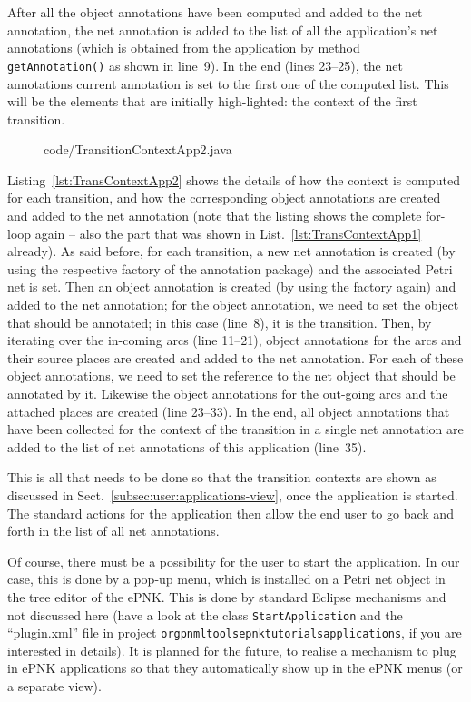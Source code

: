After all the object annotations have been computed and added to the net
annotation, the net annotation is added to the list of all the application's net
annotations (which is obtained from the application by method {\tt
getAnnotation()} as shown in line~9). In the end (lines 23--25), the net
annotations current annotation is set to the first one of the computed list.
This will be the elements that are initially high-lighted: the context of the
first transition.
 
\begin{figure}[htbp!]
%
  {code/TransitionContextApp2.java}
\end{figure}
%
Listing~\ref{lst:TransContextApp2} shows the details of how the context 
is computed for each transition, and how the corresponding object annotations
are created and added to the net annotation (note that the listing shows
the complete for-loop again -- also the part that was shown in
List.~\ref{lst:TransContextApp1} already). As said before, for each transition,
a new net annotation is created (by using the respective factory of the
annotation package) and the associated Petri net is set. Then an object
annotation is created (by using the factory again) and added to the net
annotation; for the object annotation, we need to set the object that should be
annotated; in this case (line~8), it is the transition. Then, by iterating over
the in-coming arcs (line 11--21), object annotations for the arcs and their
source places are created and added to the net annotation. For each of these
object annotations, we need to set the reference to the net object that should
be annotated by it. Likewise the object annotations for the out-going arcs
and the attached places are created (line 23--33).
In the end, all object annotations that have been collected for the context of
the transition in a single net annotation are added to the list of net
annotations of this application (line~35).

This is all that needs to be done so that the transition contexts are shown
as discussed in Sect.~\ref{subsec:user:applications-view}, once the
application is started. The standard actions for the application then allow the
end user to go back and forth in the list of all net annotations.

Of course, there must be a possibility for the user to start the application. In
our case, this is done by a pop-up menu, which is installed on a Petri net object in the tree
editor of the ePNK. This is done by standard Eclipse mechanisms and not discussed
here (have a look at the class {\tt StartApplication} and the ``plugin.xml'' file
in project
{\tt org\qnsep{}pnml\qnsep{}tools\qnsep{}epnk\qnsep{}tutorials\qnsep{}applications},
if you are interested in details). It is planned for the future, to realise a
mechanism to plug in ePNK applications so that they automatically show up in
the ePNK menus (or a separate view).%

